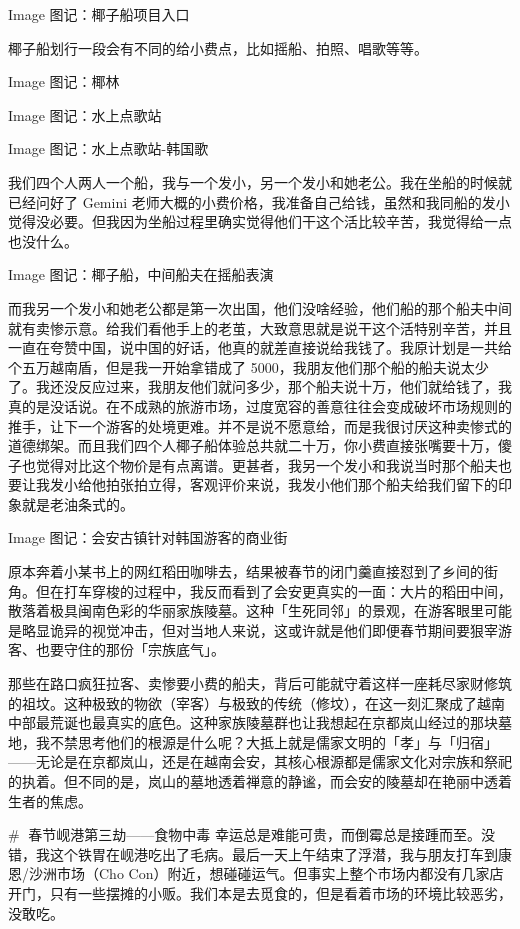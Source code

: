 Image
图记：椰子船项目入口

椰子船划行一段会有不同的给小费点，比如摇船、拍照、唱歌等等。

Image
图记：椰林


Image
图记：水上点歌站

Image
图记：水上点歌站-韩国歌

我们四个人两人一个船，我与一个发小，另一个发小和她老公。我在坐船的时候就已经问好了 Gemini 老师大概的小费价格，我准备自己给钱，虽然和我同船的发小觉得没必要。但我因为坐船过程里确实觉得他们干这个活比较辛苦，我觉得给一点也没什么。

Image
图记：椰子船，中间船夫在摇船表演

而我另一个发小和她老公都是第一次出国，他们没啥经验，他们船的那个船夫中间就有卖惨示意。给我们看他手上的老茧，大致意思就是说干这个活特别辛苦，并且一直在夸赞中国，说中国的好话，他真的就差直接说给我钱了。我原计划是一共给个五万越南盾，但是我一开始拿错成了 5000，我朋友他们那个船的船夫说太少了。我还没反应过来，我朋友他们就问多少，那个船夫说十万，他们就给钱了，我真的是没话说。在不成熟的旅游市场，过度宽容的善意往往会变成破坏市场规则的推手，让下一个游客的处境更难。并不是说不愿意给，而是我很讨厌这种卖惨式的道德绑架。而且我们四个人椰子船体验总共就二十万，你小费直接张嘴要十万，傻子也觉得对比这个物价是有点离谱。更甚者，我另一个发小和我说当时那个船夫也要让我发小给他拍张拍立得，客观评价来说，我发小他们那个船夫给我们留下的印象就是老油条式的。

Image
图记：会安古镇针对韩国游客的商业街

原本奔着小某书上的网红稻田咖啡去，结果被春节的闭门羹直接怼到了乡间的街角。但在打车穿梭的过程中，我反而看到了会安更真实的一面：大片的稻田中间，散落着极具闽南色彩的华丽家族陵墓。这种「生死同邻」的景观，在游客眼里可能是略显诡异的视觉冲击，但对当地人来说，这或许就是他们即便春节期间要狠宰游客、也要守住的那份「宗族底气」。

那些在路口疯狂拉客、卖惨要小费的船夫，背后可能就守着这样一座耗尽家财修筑的祖坟。这种极致的物欲（宰客）与极致的传统（修坟），在这一刻汇聚成了越南中部最荒诞也最真实的底色。这种家族陵墓群也让我想起在京都岚山经过的那块墓地，我不禁思考他们的根源是什么呢？大抵上就是儒家文明的「孝」与「归宿」——无论是在京都岚山，还是在越南会安，其核心根源都是儒家文化对宗族和祭祀的执着。但不同的是，岚山的墓地透着禅意的静谧，而会安的陵墓却在艳丽中透着生者的焦虑。

# 🤢春节岘港第三劫——食物中毒
幸运总是难能可贵，而倒霉总是接踵而至。没错，我这个铁胃在岘港吃出了毛病。最后一天上午结束了浮潜，我与朋友打车到康恩/沙洲市场（Cho Con）附近，想碰碰运气。但事实上整个市场内都没有几家店开门，只有一些摆摊的小贩。我们本是去觅食的，但是看着市场的环境比较恶劣，没敢吃。

